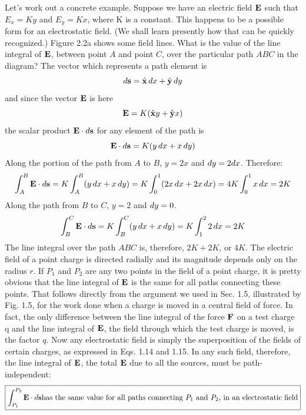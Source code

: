 Let's work out a concrete example. Suppose we have an electric
field $\mathbf{E}$ such that $E_x = Ky$ and $E_y = Kx$, where K is a constant. This
happens to be a possible form for an electrostatic field. (We shall
learn presently how that can be quickly recognized.) Figure 2.2a
shows some field lines. What is the value of the line integral of $\mathbf{E}$,
between point $A$ and point $C$, over the particular path $ABC$ in the
diagram? The vector which represents a path element is
\begin{equation}
  \mathop{d\!} \mathbf{s} = \hat{\mathbf{x}} \mathop{d\!} x + \hat{\mathbf{y}} \mathop{d\!} y
\end{equation}
and since the vector $\mathbf{E}$ is here
\begin{equation}
  \mathbf{E} = K(\hat{\mathbf{x}} y + \hat{\mathbf{y}} x)
\end{equation}
the scalar product $\mathbf{E}\cdot\mathop{d\!}\mathbf{s}$ for any element of the path is
\begin{equation}
  \mathbf{E}\cdot\mathop{d\!}\mathbf{s} = K(y\mathop{d\!} x + x\mathop{d\!} y)
\end{equation}
Along the portion of the path from $A$ to $B$, $y = 2x$ and $\mathop{d\!} y = 2 dx$.
Therefore:
\begin{equation}
  \int_A^B \mathbf{E}\cdot\mathop{d\!}\mathbf{s} = K\int_A^B  (y\mathop{d\!} x+x\mathop{d\!} y)
         = K\int_0^1(2x\mathop{d\!} x+2x\mathop{d\!} x)
         = 4K\int_0^1 x \mathop{d\!} x = 2K
\end{equation}
Along the path from $B$ to $C$, $y = 2$ and $\mathop{d\!} y = 0$.
\begin{equation}
  \int_B^C \mathbf{E}\cdot\mathop{d\!}\mathbf{s} = K \int_B^C(y\mathop{d\!} x+x\mathop{d\!} y) = K\int_1^22\mathop{d\!} x = 2K
\end{equation}
The line integral over the path $ABC$ is, therefore, $2K + 2K$, or $4K$.
The electric field of a point charge is directed radially and its magnitude
depends only on the radius $r$. If $P_1$ and $P_2$ are any two points
in the field of a point charge, it is pretty obvious that the line integral
of $\mathbf{E}$ is the same for all paths connecting these points. That follows
directly from the argument we used in Sec. 1.5, illustrated by Fig. 1.5,
for the work done when a charge is moved in a central field of force.
In fact, the only difference between the line integral of the force $\mathbf{F}$ on
a test charge q and the line integral of $\mathbf{E}$, the field through which the
test charge is moved, is the factor $q$. Now any electrostatic field is
simply the superposition of the fields of certain charges, as expressed
in Eqs. 1.14 and 1.15. In any such field, therefore, the line integral
of $\mathbf{E}$, the total $\mathbf{E}$ due to all the sources, must be path-independent:
\begin{equation}
\boxed{
  \int_{P_1}^{P_2} \mathbf{E}\cdot\mathop{d\!}\mathbf{s} \text{has the same value for all paths connecting
       $P_1$ and $P_2$, in an electrostatic field}
}
\end{equation}


